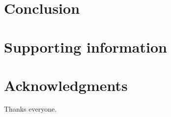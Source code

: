 \documentclass[10pt,letterpaper]{article}
\begin{document}
\section*{Conclusion}





\section*{Supporting information}



\section*{Acknowledgments}
Thanks everyone.


\nolinenumbers

%
%
% 
 



\end{document}
